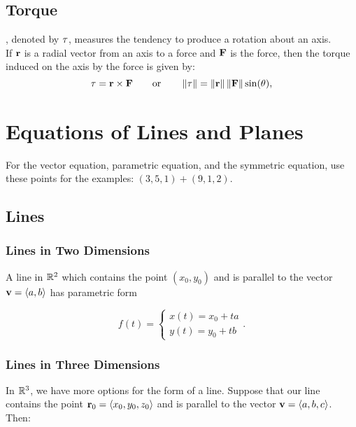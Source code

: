 \subsection{Torque}

, denoted by \(\mathbf{\tau}\), measures the tendency to produce a rotation about an axis. \\

If \(\mathbf{r}\) is a radial vector from an axis to a force and \(\mathbf{F}\) is the force, then the torque induced on the axis by the force is given by:
\[
    \mathbf{\tau} = \mathbf{r} \times \mathbf{F} \qquad \text{or} \qquad \left\lVert \mathbf{\mathbf{\tau}}\right\rVert = \left\lVert \mathbf{r}\right\rVert\left\lVert \mathbf{F}\right\rVert\sin(\theta),
\]


\section{Equations of Lines and Planes}

For the vector equation, parametric equation, and the symmetric equation, use these points for the examples: \((3,5,1) + (9,1,2)\).

\subsection{Lines}

\subsubsection{Lines in Two Dimensions}

A line in \(\mathbb{R}^{2}\) which contains the point \((x_{0},y_{0})\) and is parallel to the vector \(\mathbf{v} = \langle a,b \rangle\) has parametric form

\[
    f(t) = \begin{cases}
        x(t) = x_{0} + ta \\
        y(t) = y_{0} + tb
    \end{cases}.
\]

\subsubsection{Lines in Three Dimensions}

In \(\mathbb{R}^{3}\), we have more options for the form of a line. Suppose that our line contains the point \(\mathbf{r}_{0} = \langle x_{0},y_{0},z_{0} \rangle\) and is parallel to the vector \(\mathbf{v} = \langle a,b,c \rangle\). Then:

